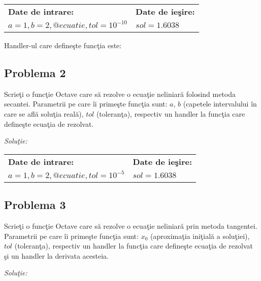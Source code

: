 \documentclass{exam}
\newcommand{\octavescript}[2]{
	
}
\begin{document}
\begin{center}
	\begin{tabular}{| l | l |}
		\hline
		\textbf{Date de intrare:}                  & \textbf{Date de ieşire:} \\
		$a = 1, b = 2, @ecuatie, tol = 10 ^ {-10}$ & $sol = 1.6038$           \\
		\hline
	\end{tabular}
\end{center}

Handler-ul care defineşte funcţia este:

\octavescript{./src/ecuatie.m}{Handler funcţie.}


\subsection{Problema 2}
Scrieţi o funcţie Octave care să rezolve o ecuaţie neliniară folosind metoda secantei. Parametrii pe care îi primeşte funcţia sunt: $a$, $b$ (capetele intervalului în care se află soluţia reală), $tol$ (toleranţa), respectiv un handler la funcţia care defineşte ecuaţia de rezolvat.

\textit{Soluţie:}

\octavescript{./src/secanta.m}{Regula secantei.}

\begin{center}
	\begin{tabular}{| l | l |}
		\hline
		\textbf{Date de intrare:}                 & \textbf{Date de ieşire:} \\
		$a = 1, b = 2, @ecuatie, tol = 10 ^ {-5}$ & $sol = 1.6038$           \\
		\hline
	\end{tabular}
\end{center}


\subsection{Problema 3}
Scrieţi o funcţie Octave care să rezolve o ecuaţie neliniară  prin metoda tangentei. Parametrii pe care îi primeşte funcţia sunt: $x_0$ (aproximaţia iniţială a soluţiei), $tol$ (toleranţa), respectiv un handler la funcţia care defineşte ecuaţia de rezolvat şi un handler la derivata acesteia.

\textit{Soluţie:}
\end{document}
